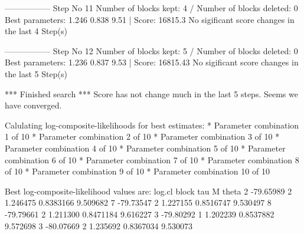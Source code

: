 \begin{Schunk}
\begin{Soutput}
----------------- 
Step No 11 
Number of blocks kept: 4  / Number of blocks deleted: 0 
Best parameters:  1.246 0.838 9.51 | Score: 16815.3 
No sigificant score changes in the last 4 Step(s) 

----------------- 
Step No 12 
Number of blocks kept: 5  / Number of blocks deleted: 0 
Best parameters:  1.236 0.837 9.53 | Score: 16815.43 
No sigificant score changes in the last 5 Step(s) 

*** Finished search *** 
Score has not change much in the last 5 steps. 
Seems we have converged. 

Calulating log-composite-likelihoods for best estimates: 
* Parameter combination 1 of 10 
* Parameter combination 2 of 10 
* Parameter combination 3 of 10 
* Parameter combination 4 of 10 
* Parameter combination 5 of 10 
* Parameter combination 6 of 10 
* Parameter combination 7 of 10 
* Parameter combination 8 of 10 
* Parameter combination 9 of 10 
* Parameter combination 10 of 10 


Best log-composite-likelihood values are: 
     log.cl block      tau         M    theta
2 -79.65989     2 1.246475 0.8383166 9.509682
7 -79.73547     2 1.227155 0.8516747 9.530497
8 -79.79661     2 1.211300 0.8471184 9.616227
3 -79.80292     1 1.202239 0.8537882 9.572698
3 -80.07669     2 1.235692 0.8367034 9.530073
\end{Soutput}
\end{Schunk}

